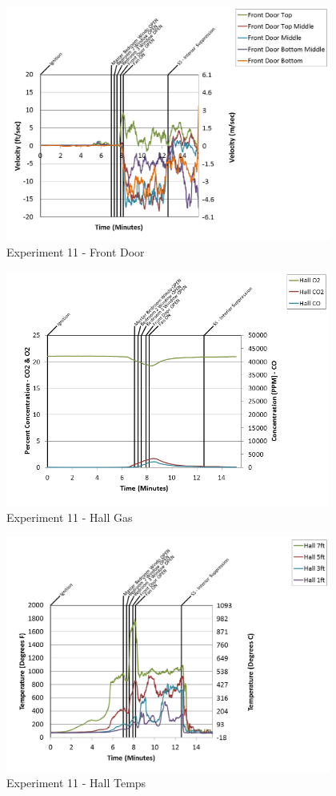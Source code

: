\documentclass{article}
\begin{document}
\begin{appendices}
\begin{figure}[h!]
	\centering
	\includegraphics[height=3.05in]{0_Images/Results_Charts/Exp_11_Charts/FrontDoor.png}
	\caption{Experiment 11 - Front Door}
\end{figure}

\clearpage

\begin{figure}[h!]
	\centering
	\includegraphics[height=3.05in]{0_Images/Results_Charts/Exp_11_Charts/HallGas.png}
	\caption{Experiment 11 - Hall Gas}
\end{figure}


\begin{figure}[h!]
	\centering
	\includegraphics[height=3.05in]{0_Images/Results_Charts/Exp_11_Charts/HallTemps.png}
	\caption{Experiment 11 - Hall Temps}
\end{figure}


\end{appendices}
\end{document}
